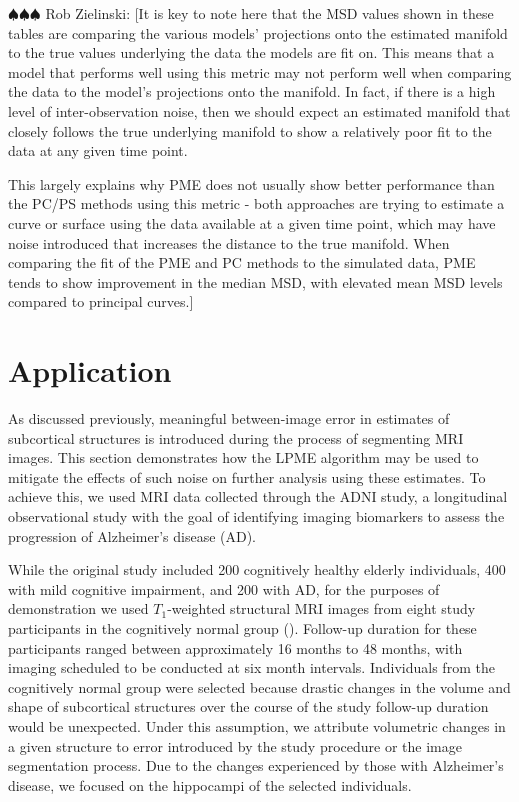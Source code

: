 \documentclass[11pt,reqno]{article}
\newcommand{\zielinski}[1]{{\color{blue} \sf $\spadesuit\spadesuit\spadesuit$ Rob Zielinski: [#1]}}
\theoremstyle{definition}
\begin{document}
\zielinski{It is key to note here that the MSD values shown in these tables are comparing the various models' projections onto the estimated manifold to the true values underlying the data the models are fit on. This means that a model that performs well using this metric may not perform well when comparing the data to the model's projections onto the manifold. In fact, if there is a high level of inter-observation noise, then we should expect an estimated manifold that closely follows the true underlying manifold to show a relatively poor fit to the data at any given time point.

This largely explains why PME does not usually show better performance than the PC/PS methods using this metric - both approaches are trying to estimate a curve or surface using the data available at a given time point, which may have noise introduced that increases the distance to the true manifold. When comparing the fit of the PME and PC methods to the simulated data, PME tends to show improvement in the median MSD, with elevated mean MSD levels compared to principal curves.}

\section{Application}

As discussed previously, meaningful between-image error in estimates of subcortical structures is introduced during the process of segmenting MRI images. This section demonstrates how the LPME algorithm may be used to mitigate the effects of such noise on further analysis using these estimates. To achieve this, we used MRI data collected through the ADNI study, a longitudinal observational study with the goal of identifying imaging biomarkers to assess the progression of Alzheimer's disease (AD). 

While the original study included 200 cognitively healthy elderly individuals, 400 with mild cognitive impairment, and 200 with AD, for the purposes of demonstration we used $T_1$-weighted structural MRI images from eight study participants in the cognitively normal group (\cite{jack2008adni}). Follow-up duration for these participants ranged between approximately 16 months to 48 months, with imaging scheduled to be conducted at six month intervals. Individuals from the cognitively normal group were selected because drastic changes in the volume and shape of subcortical structures over the course of the study follow-up duration would be unexpected. Under this assumption, we attribute volumetric changes in a given structure to error introduced by the study procedure or the image segmentation process. Due to the changes experienced by those with Alzheimer's disease, we focused on the hippocampi of the selected individuals. 
\end{document}
